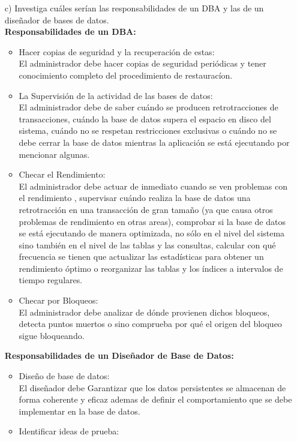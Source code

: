 \documentclass[a4paper, 12pt]{report}
\begin{document}
\begin{enumerate}
{\begin{enumerate}
    \item[c)] Investiga cuáles serían las responsabilidades de un DBA y las de un diseñador de bases de datos.\\
    \textbf{Responsabilidades de un DBA:}
    \begin{itemize}
    	\item Hacer copias de seguridad y la recuperación de estas:\\
    	El administrador debe hacer copias de seguridad periódicas y tener conocimiento completo del procedimiento de restauracíon.
    	\item La Supervisión de la actividad de las bases de datos:\\
    	El administrador debe de saber cuándo se producen retrotracciones de transacciones, cuándo  la base de datos supera el espacio en disco del sistema, cuándo no se respetan restricciones exclusivas o cuándo no se debe cerrar la base de datos mientras la aplicación se está ejecutando por mencionar algunas.
    	\item Checar el Rendimiento:\\
    	El administrador debe actuar de inmediato cuando se ven problemas con el rendimiento , supervisar cuándo realiza la base de datos una retrotracción en una transacción de gran tamaño (ya que causa otros problemas de rendimiento en otras areas), comprobar si la base de datos se está ejecutando de manera optimizada, no sólo en el nivel del sistema sino también en el nivel de las tablas y las consultas, calcular con qué frecuencia se tienen que actualizar las estadísticas para obtener un rendimiento óptimo o reorganizar las tablas y los índices a intervalos de tiempo regulares.
    	\item Checar por Bloqueos:\\
    	El administrador debe analizar de dónde provienen dichos bloqueos, detecta puntos muertos o sino comprueba por qué el origen del bloqueo sigue bloqueando.
    \end{itemize}
    \textbf{Responsabilidades de un Diseñador de Base de Datos:}
    \begin{itemize}
    	\item Diseño de base de datos:\\
    	El diseñador debe Garantizar que los datos persistentes se almacenan de forma coherente y eficaz ademas de definir el comportamiento que se debe implementar en la base de datos.
    	\item Identificar ideas de prueba:\\

\end{itemize}
\end{enumerate}}
\end{enumerate}
\end{document}
